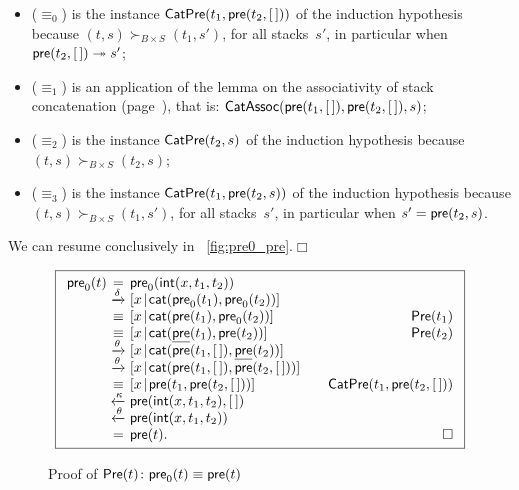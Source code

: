 \begin{itemize}

  \item (\(\equiv_0\)) is the instance
  \(\textsf{CatPre}({t_1,\textsf{pre}(t_2,[\,])})\) of the induction
  hypothesis because \((t,s) \succ_{B \times S} (t_1,s')\), for all
  stacks~\(s'\), in particular when \(\textsf{pre}(t_2,[\,])
  \twoheadrightarrow s'\);

  \item (\(\equiv_1\)) is an application of the lemma on the
  associativity of stack concatenation
  (page~\pageref{proof:assoc_cat}), that is:
  \(\textsf{CatAssoc}({\textsf{pre}(t_1,[\,]),\textsf{pre}(t_2,[\,]),s})\);

  \item (\(\equiv_2\)) is the instance
  \(\textsf{CatPre}({t_2,s})\) of the
  induction hypothesis because \((t,s) \succ_{B \times S} (t_2,s)\);

  \item (\(\equiv_3\)) is the instance \(\textsf{CatPre}({t_1,
    \textsf{pre}(t_2,s)})\) of the induction hypothesis because \((t,s)
    \succ_{B \times S} (t_1,s')\), for all stacks~\(s'\), in
    particular when \(s' = \textsf{pre}(t_2,s)\).
\end{itemize}
We can resume conclusively in \fig~\vref{fig:pre0_pre}.\hfill\(\Box\)
\begin{figure}[]
\begin{equation*}
\boxed{%
\begin{array}{r@{\;}c@{\;}l@{\qquad}r}
\fun{pre}_0(t)
& = & \fun{pre}_0(\fun{int}(x,t_1,t_2))\\
& \xrightarrow{\smash{\delta}}
& \cons{x}{\fun{cat}(\fun{pre}_0(t_1), \fun{pre}_0(t_2))}\\
& \equiv & \cons{x}{\fun{cat}(\fun{pre}(t_1), \fun{pre}_0(t_2))}
& \IH{\pred{Pre}{t_1}}\\
& \equiv & \cons{x}{\fun{cat}(\ufun{pre}(t_1), \fun{pre}(t_2))}
& \IH{\pred{Pre}{t_2}}\\
& \xrightarrow{\smash{\theta}}
& \cons{x}{\fun{cat}(\fun{pre}(t_1,\el), \ufun{pre}(t_2))}\\
& \xrightarrow{\smash{\theta}}
& \cons{x}{\fun{cat}(\fun{pre}(t_1,\el), \fun{pre}(t_2,\el))}\\
& \equiv
& \cons{x}{\fun{pre}(t_1,\fun{pre}(t_2,\el))}
& \IH{\pred{CatPre}{t_1,\fun{pre}(t_2,\el)}}\\
& \xleftarrow{\smash{\kappa}}
& \fun{pre}(\fun{int}(x,t_1,t_2),\el)\\
& \xleftarrow{\smash{\theta}}
& \fun{pre}(\fun{int}(x,t_1,t_2))\\
& = & \fun{pre}(t). & \hfill\Box
\end{array}}
\end{equation*}
\caption{Proof of \(\textsf{Pre}({t}) \colon \textsf{pre}_0(t) \equiv
  \textsf{pre}(t)\)}
\label{fig:pre0_pre}
\end{figure}

